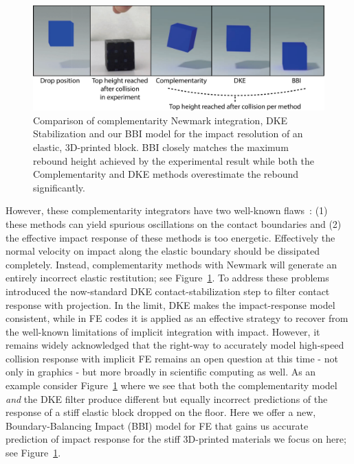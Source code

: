 \begin{figure}
	\centering
	\includegraphics[width=\columnwidth]{figs/Figure_2_BBI}	
	\caption{Comparison of complementarity Newmark integration, DKE Stabilization and our BBI model for the impact resolution of an elastic, 3D-printed block. BBI closely matches the maximum rebound height achieved by the experimental result while both the Complementarity and DKE methods overestimate the rebound significantly.}
	\label{fig:BBI_block_compare}
\end{figure}

However, these complementarity integrators have two well-known flaws~\cite{Deuflhard:2008fu}: (1) these methods can yield spurious oscillations on the contact boundaries and (2) the effective impact response of these methods is too energetic. Effectively the normal velocity on impact along the elastic boundary should be dissipated completely. Instead, complementarity methods with Newmark will generate an entirely incorrect elastic restitution; see Figure~\ref{fig:BBI_block_compare}. To address these problems~\citet{Deuflhard:2008fu} introduced the now-standard DKE contact-stabilization step to filter contact response with projection. In the limit, DKE makes the impact-response model consistent,
while in FE codes it is applied as an effective strategy to recover from the well-known limitations of implicit integration with impact. However, it remains widely acknowledged that the right-way to accurately model high-speed collision response with implicit FE remains an open question at this time - not only in graphics - but more broadly in scientific computing as well. As an example consider Figure~\ref{fig:BBI_block_compare} where we see that both the complementarity model \emph{and} the DKE filter produce different but equally incorrect predictions of the response of a stiff elastic block dropped on the floor. Here we offer a new, Boundary-Balancing Impact (BBI) model for FE that gains us accurate prediction of impact response for the stiff 3D-printed materials we focus on here; see Figure~\ref{fig:BBI_block_compare}.

